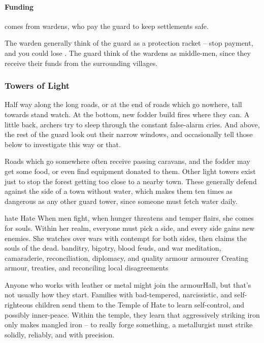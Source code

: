\begin{multicols}{2}

\paragraph{Funding}
comes from \glspl{warden}, who pay the guard to keep settlements safe.

The \gls{warden} generally think of the \gls{guard} as a protection racket -- stop payment, and you could lose .
The \gls{guard} think of the \glspl{warden} as middle-men, since they receive their funds from the surrounding \glspl{village}.

\subsubsection{Towers of Light}
Half way along the long roads, or at the end of roads which go nowhere, tall towards stand watch.
At the bottom, new fodder build fires where they can.
A little back, archers try to sleep through the constant false-alarm cries.
And above, the rest of the guard look out their narrow windows, and occasionally tell those below to investigate this way or that.

Roads which go somewhere often receive passing caravans, and the fodder may get some food, or even find equipment donated to them.
Other light towers exist just to stop the forest getting too close to a nearby town.
These generally defend against the side of a town without water, which makes them ten times as dangerous as any other \gls{guard} tower, since someone must fetch water daily.

  {\gls{hate}}%
  {Hate}%
  {When men fight, when hunger threatens and temper flairs, she comes for souls.
  Within her realm, everyone must pick a side, and every side gains new enemies.
  She watches over wars with contempt for both sides, then claims the souls of the dead.}%
  {banditry, bigotry, blood feuds, and war}%
  {meditation, camaraderie, reconciliation, diplomacy, and quality armour}%
  {\Gls{armourer}}%
  {Creating armour, treaties, and reconciling local disagreements}%

Anyone who works with leather or metal might join the \gls{armourHall}, but that's not usually how they start.
Families with bad-tempered, narcissistic, and self-righteous children send them to the Temple of Hate to learn self-control, and possibly inner-peace.
Within the temple, they learn that aggressively striking iron only makes mangled iron -- to really forge something, a metallurgist must strike solidly, reliably, and with precision.


\end{multicols}
